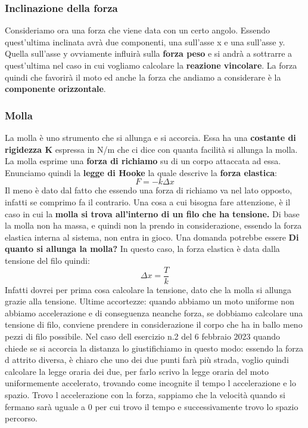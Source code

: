\documentclass{article}
\numberwithin{equation}{subsection}
\begin{document}
\subsubsection{Inclinazione della forza}
Consideriamo ora una forza che viene data con un certo angolo. Essendo quest'ultima inclinata avrà due componenti, una sull'asse x e una sull'asse y. Quella sull'asse y ovviamente influirà sulla \textbf{forza peso} e si andrà a sottrarre a quest'ultima nel caso in cui vogliamo calcolare la \textbf{reazione vincolare}. La forza quindi che favorirà il moto ed anche la forza che andiamo a considerare è la \textbf{componente orizzontale}.
\subsubsection{Molla}
La molla è uno strumento che si allunga e si accorcia. Essa ha una \textbf{costante di rigidezza K} espressa in N/m che ci dice con quanta facilità si allunga la molla. La molla esprime una \textbf{forza di richiamo} su di un corpo attaccata ad essa. Enunciamo quindi la \textbf{legge di Hooke} la quale descrive la \textbf{forza elastica}:
\begin{equation}
    F=-k\Delta x
\end{equation}
Il meno è dato dal fatto che essendo una forza di richiamo va nel lato opposto, infatti se comprimo fa il contrario. Una cosa a cui bisogna fare attenzione, è il caso in cui la \textbf{molla si trova all'interno di un filo che ha tensione.} Di base la molla non ha massa, e quindi non la prendo in considerazione, essendo la forza elastica interna al sistema, non entra in gioco. Una domanda potrebbe essere \textbf{Di quanto si allunga la molla?} In questo caso, la forza elastica è data dalla tensione del filo quindi:
\begin{equation}
    \Delta x=\frac{T}{k}
\end{equation}
Infatti dovrei per prima cosa calcolare la tensione, dato che la molla si allunga grazie alla tensione. Ultime accortezze: quando abbiamo un moto uniforme non abbiamo accelerazione e di conseguenza neanche forza, se dobbiamo calcolare una tensione di filo, conviene prendere in considerazione il corpo che ha in ballo meno pezzi di filo possibile. Nel caso dell esercizio n.2 del 6 febbraio 2023 quando chiede se si accorcia la distanza lo giustifichiamo in questo modo: essendo la forza d attrito diversa, è chiaro che uno dei due punti farà più strada, voglio quindi calcolare la legge oraria dei due, per farlo scrivo la legge oraria del moto uniformemente accelerato, trovando come incognite il tempo l accelerazione e lo spazio. Trovo l accelerazione con la forza, sappiamo che la velocità quando si fermano sarà uguale a 0 per cui trovo il tempo e successivamente trovo lo spazio percorso.
\end{document}
